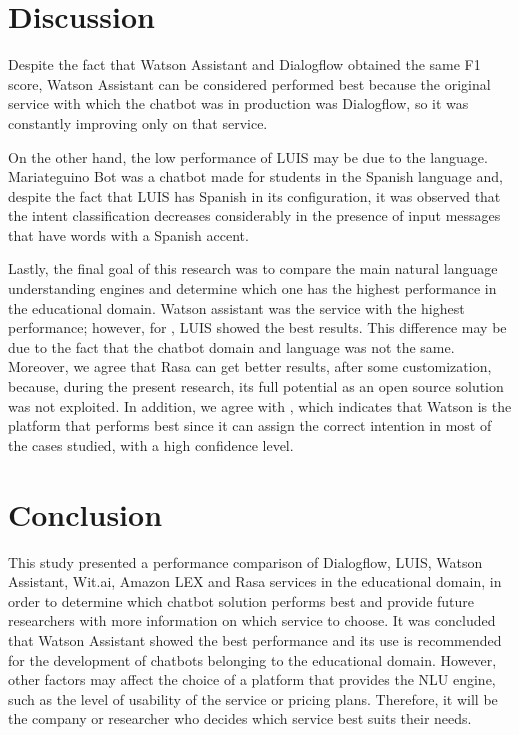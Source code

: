 \documentclass[conference, letterpaper]{IEEEtran}
\begin{document}
\section{Discussion} \label{sec:discussion}

Despite the fact that Watson Assistant and Dialogflow obtained the same F1 score, Watson Assistant can be considered performed best because the original service with which the chatbot was in production was Dialogflow, so it was constantly improving only on that service.

On the other hand, the low performance of LUIS may be due to the language. Mariateguino Bot was a chatbot made for students in the Spanish language and, despite the fact that LUIS has Spanish in its configuration, it was observed that the intent classification decreases considerably in the presence of input messages that have words with a Spanish accent.

Lastly, the final goal of this research was to compare the main natural language understanding engines and determine which one has the highest performance in the educational domain. Watson assistant was the service with the highest performance; however, for \cite{Braun2017}, LUIS showed the best results. This difference may be due to the fact that the chatbot domain and language was not the same. Moreover, we agree that Rasa can get better results, after some customization, because, during the present research, its full potential as an open source solution was not exploited. In addition, we agree with \cite{Canonico2018}, which indicates that Watson is the platform that performs best since it can assign the correct intention in most of the cases studied, with a high confidence level.


\section{Conclusion}

This study presented a performance comparison of Dialogflow, LUIS, Watson Assistant, Wit.ai, Amazon LEX and Rasa  services in the educational domain, in order to determine which chatbot solution performs best and provide future researchers with more information on which service to choose. It was concluded that Watson Assistant showed the best performance and its use is recommended for the development of chatbots belonging to the educational domain. However, other factors may affect the choice of a platform that provides the NLU engine, such as the level of usability of the service or pricing plans. Therefore, it will be the company or researcher who decides which service best suits their needs.
\end{document}
